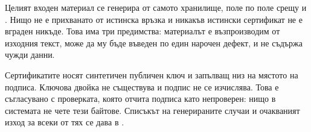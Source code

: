 Целият входен материал се генерира от самото хранилище, поле по поле срещу \cite{rfc8446} и
\cite{rfc5280}. Нищо не е прихванато от истинска връзка и никакъв истински сертификат не е
вграден никъде. Това има три предимства: материалът е възпроизводим от изходния текст, може
да му бъде въведен по един нарочен дефект, и не съдържа чужди данни.

Сертификатите носят синтетичен публичен ключ и запълващ низ на мястото на подписа. Ключова
двойка не съществува и подпис не се изчислява. Това е съгласувано с проверката, която
отчита подписа като непроверен: нищо в системата не чете тези байтове. Списъкът на
генерираните случаи и очакваният изход за всеки от тях се дава в .
